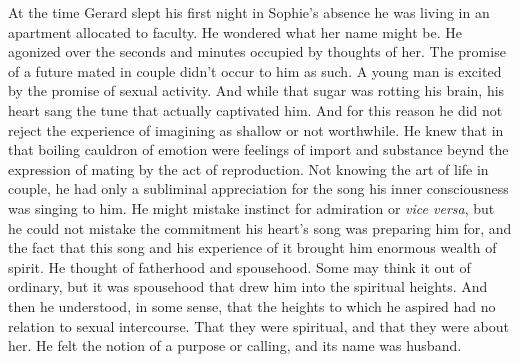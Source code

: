 

At the time Gerard slept his first night in Sophie's absence he was
living in an apartment allocated to faculty.  He wondered what her
name might be.  He agonized over the seconds and minutes occupied by
thoughts of her.  The promise of a future mated in couple didn't occur
to him as such.  A young man is excited by the promise of sexual
activity.  And while that sugar was rotting his brain, his heart sang
the tune that actually captivated him.  And for this reason he did not
reject the experience of imagining as shallow or not worthwhile.  He
knew that in that boiling cauldron of emotion were feelings of import
and substance beynd the expression of mating by the act of
reproduction.  Not knowing the art of life in couple, he had only a
subliminal appreciation for the song his inner consciousness was
singing to him.  He might mistake instinct for admiration or {\it vice
versa}, but he could not mistake the commitment his heart's song was
preparing him for, and the fact that this song and his experience of
it brought him enormous wealth of spirit.  He thought of fatherhood
and spousehood.  Some may think it out of ordinary, but it was
spousehood that drew him into the spiritual heights.  And then he
understood, in some sense, that the heights to which he aspired had no
relation to sexual intercourse.  That they were spiritual, and that
they were about her.  He felt the notion of a purpose or calling, and
its name was husband.

\bye

